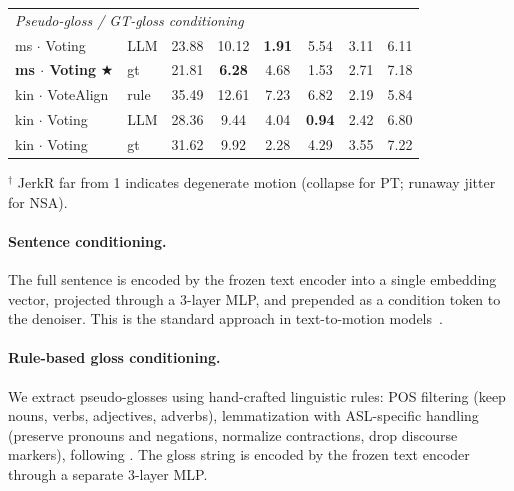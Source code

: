 \documentclass{article}
\begin{document}
\begin{table}[t]
\begin{tabular}{llcccccc}
    \midrule
    \multicolumn{8}{l}{\textit{Pseudo-gloss / GT-gloss conditioning}} \\
    \quad ms $\cdot$ Voting                                        & LLM            & 23.88          & 10.12         & \textbf{1.91} & 5.54          & 3.11          & 6.11 \\
    \quad \textbf{ms $\cdot$ Voting} $\bigstar$                    & gt             & 21.81          & \textbf{6.28} & 4.68          & 1.53          & 2.71          & 7.18 \\
    \quad kin $\cdot$ VoteAlign                                    & rule           & 35.49          & 12.61         & 7.23          & 6.82          & 2.19          & 5.84 \\
    \quad kin $\cdot$ Voting                                       & LLM            & 28.36          & 9.44          & 4.04          & \textbf{0.94} & 2.42          & 6.80 \\
    \quad kin $\cdot$ Voting                                       & gt             & 31.62          & 9.92          & 2.28          & 4.29          & 3.55          & 7.22 \\
    \bottomrule
  \end{tabular}
  \par\smallskip
  \footnotesize $^\dagger$ JerkR far from 1 indicates degenerate motion (collapse for PT; runaway jitter for NSA).
\end{table}

\paragraph{Sentence conditioning.}
The full sentence is encoded by the frozen text encoder into a single embedding vector, projected through a 3-layer MLP, and prepended as a condition token to the denoiser.
This is the standard approach in text-to-motion models~\citep{tevet2023human,hong2026phonologyguided}.

\paragraph{Rule-based gloss conditioning.}
We extract pseudo-glosses using hand-crafted linguistic rules: POS filtering (keep nouns, verbs, adjectives, adverbs), lemmatization with ASL-specific handling (preserve pronouns and negations, normalize contractions, drop discourse markers), following \citet{hong2026phonologyguided}.
The gloss string is encoded by the frozen text encoder through a separate 3-layer MLP.
\end{document}
